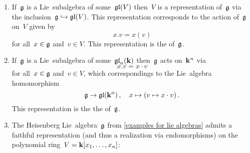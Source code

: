 \begin{examples}
  \label{examples for representations}
  \leavevmode
  \begin{enumerate}
    \item 
      If~$\mathfrak{g}$ is a Lie~subalgebra of some~$\mathfrak{gl}(V)$ then~$V$ is a representation of~$\mathfrak{g}$ via the inclusion~$\mathfrak{g} \hookrightarrow \mathfrak{gl}(V)$.
      This representation corresponds to the action of~$\mathfrak{g}$ on~$V$ given by
      \[
        x.v
        =
        x(v)
      \]
      for all~$x \in \mathfrak{g}$ and~$v \in V$.
      This representation is the  of~$\mathfrak{g}$.
    \item
      If~$\mathfrak{g}$ is a Lie~subalgebra of some~$\mathfrak{gl}_n(\mathbf{k})$ then~$\mathfrak{g}$ acts on~$\mathbf{k}^n$ via
      \[
        x.v
        =
        x \cdot v
      \]
      for all~$x \in \mathfrak{g}$ and~$v \in V$, which correspondings to the Lie~algebra homomorphism
      \[
        \mathfrak{g}
        \to
        \mathfrak{gl}(\mathbf{k}^n) \,,
        \quad
        x
        \mapsto
        (v \mapsto x \cdot v) \,.
      \]
      This representation is the the  of~$\mathfrak{g}$.
    \item
      The Heisenberg Lie~algebra~$\mathfrak{g}$ from \cref{examples for lie algebras} admits a faithful representation (and thus a realization via endomorphisms) on the polynomial ring~$V = \mathbf{k}[x_1, \dotsc, x_n]$:
      

\end{enumerate}
\end{examples}
